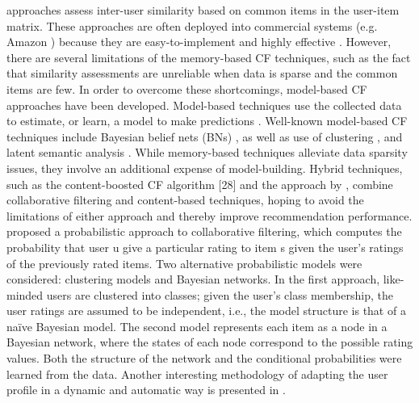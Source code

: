\documentclass[11pt,oneside]{book}
\begin{document}
approaches assess inter-user similarity based on common items in the
user-item matrix. These approaches are often deployed into commercial
systems (e.g. Amazon ) because they are easy-to-implement and highly
effective \citep{vapnik1999overview}. However, there are several limitations of the
memory-based CF techniques, such as the fact that similarity
assessments are unreliable when data is sparse and the common items
are few. In order to overcome these shortcomings, model-based CF
approaches have been developed. Model-based techniques use the
collected data to estimate, or learn, a model to make predictions
\citep{breese98}. Well-known model-based CF techniques include Bayesian belief
nets (BNs) \citep{breese98}, as well as use of clustering \citep{ungar1998clustering},\citep{zhu2009analyzing} and latent
semantic analysis \citep{hofmann2004latent}. While memory-based techniques alleviate data
sparsity issues, they involve an additional expense of model-building.
Hybrid techniques, such as the content-boosted CF algorithm [28] and
the approach by \citep{gong2009combining}, combine collaborative filtering and
content-based techniques, hoping to avoid the limitations of either
approach and thereby improve recommendation performance. \citep{breese98} proposed a probabilistic approach to collaborative filtering,
which computes the probability that user u give a particular rating to
item s given the user’s ratings of the previously rated items. Two
alternative probabilistic models were considered: clustering models
and Bayesian networks. In the first approach, like-minded users are
clustered into classes; given the user’s class membership, the user
ratings are assumed to be independent, i.e., the model structure is
that of a naïve Bayesian model. The second model represents each item
as a node in a Bayesian network, where the states of each node
correspond to the possible rating values. Both the structure of the
network and the conditional probabilities were learned from the
data. Another interesting methodology of adapting the user profile in
a dynamic and automatic way is presented in \citep{marin2013dynamic}.
\end{document}
